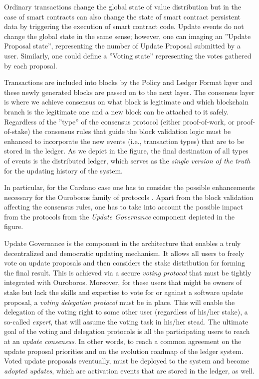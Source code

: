 Ordinary transactions change the global state of value distribution but in the case of smart contracts can also change the state of smart contract persistent data by triggering the execution of smart contract code. Update events do not change the global state in the same sense; however, one can imaging an ''Update Proposal state'', representing the number of Update Proposal submitted by a user. Similarly, one could define a ''Voting state'' representing the votes gathered by each proposal.

Transactions are included into blocks by the Policy and Ledger Format layer and these newly generated blocks are passed on to the next layer. The consensus layer is where we achieve consensus on what block is legitimate and which blockchain branch is the legitimate one and a new block can be attached to it safely. Regardless of the ''type'' of the consensus protocol (either proof-of-work, or proof-of-stake) the consensus rules that guide the block validation logic must be enhanced to incorporate the new events (i.e., transaction types) that are to be stored in the ledger. As we depict in the figure, the final destination of all types of events is the distributed ledger, which serves as the \emph{single version of the truth} for the updating history of the system.

In particular, for the Cardano case one has to consider the possible enhancements necessary for the Ouroboros family of protocols \cite{C:KRDO17}. Apart from the block validation affecting the consensus rules, one has to take into account the possible impact from the protocols from the \emph{Update Governance} component depicted in the figure.

Update Governance is the component in the architecture that enables a truly decentralized and democratic updating mechanism. It allows all users to freely vote on update proposals and then considers the stake distribution for forming the final result. This is achieved via a secure \emph{voting protocol} that must be tightly integrated with Ouroboros. Moreover, for these users that might be owners of stake but lack the skills and expertise to vote for or against a software update proposal, a \emph{voting delegation protocol} must be in place. This will enable the delegation of the voting right to some other user (regardless of his/her stake), a so-called \emph{expert}, that will assume the voting task in his/her stead. The ultimate goal of the voting and delegation protocols is all the participating users to reach at an \emph{update consensus}. In other words, to reach a common agreement on the update proposal priorities and on the evolution roadmap of the ledger system. Voted update proposals eventually, must be deployed to the system and become \emph{adopted updates}, which are activation events that are stored in the ledger, as well.

